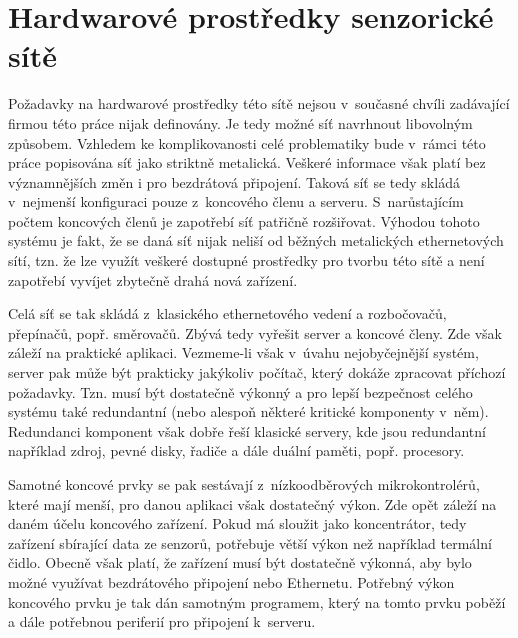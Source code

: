 \section{Hardwarové prostředky senzorické sítě}
Požadavky na hardwarové prostředky této sítě nejsou v~současné chvíli za\-dá\-va\-jí\-cí firmou této práce nijak definovány. Je tedy možné síť navrhnout libovolným způsobem. Vzhledem ke komplikovanosti celé problematiky bude v~rámci této práce popisována síť jako striktně metalická. Veškeré informace však platí bez významnějších změn i pro bezdrátová připojení. Taková síť se tedy skládá v~nejmenší konfiguraci pouze z~koncového členu a serveru. S~narůstajícím počtem koncových členů je zapotřebí síť patřičně rozšiřovat. Výhodou tohoto systému je fakt, že se daná síť nijak neliší od běžných metalických ethernetových sítí, tzn. že lze využít veškeré dostupné prostředky pro tvorbu této sítě a není zapotřebí vyvíjet zbytečně drahá nová zařízení.

Celá síť se tak skládá z~klasického ethernetového vedení a rozbočovačů, přepínačů, popř. směrovačů. Zbývá tedy vyřešit server a koncové členy. Zde však záleží na praktické aplikaci. Vezmeme-li však v~úvahu nejobyčejnější systém, server  pak může být prakticky jakýkoliv počítač, který dokáže zpracovat příchozí požadavky. Tzn. musí být dostatečně výkonný a pro lepší bezpečnost celého systému také redundantní (nebo alespoň některé kritické komponenty v~něm). Redundanci komponent však dobře řeší klasické servery, kde jsou redundantní například zdroj, pevné disky, řadiče a dále duální paměti, popř. procesory.

Samotné koncové prvky se pak sestávají z~nízkoodběrových mikrokontrolérů,  které mají menší, pro danou aplikaci však dostatečný výkon. Zde opět záleží na daném účelu koncového zařízení. Pokud má sloužit jako koncentrátor, tedy zařízení sbírající data ze senzorů, potřebuje větší výkon než například termální čidlo. Obecně však platí, že zařízení musí být dostatečně výkonná, aby bylo možné využívat bezdrátového připojení nebo Ethernetu.  Potřebný výkon koncového prvku je tak dán samotným programem, který na tomto prvku poběží a dále potřebnou periferií pro připojení k~serveru.

